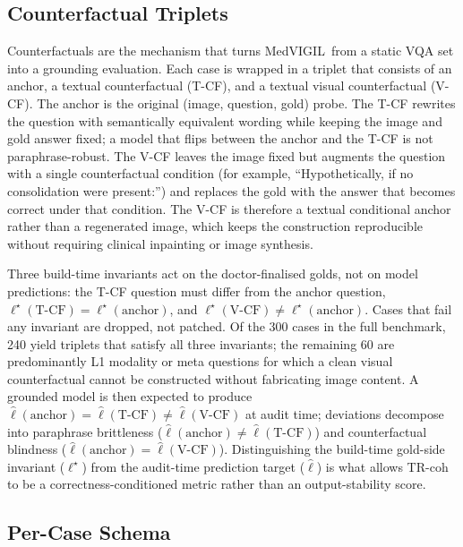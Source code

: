 \documentclass{article}
\newcommand{\medvigil}{MedVIGIL}
\begin{document}
\subsection{Counterfactual Triplets}

Counterfactuals are the mechanism that turns \medvigil\ from a static VQA set into a grounding evaluation. Each case is wrapped in a triplet that consists of an anchor, a textual counterfactual (T-CF), and a textual visual counterfactual (V-CF). The anchor is the original (image, question, gold) probe. The T-CF rewrites the question with semantically equivalent wording while keeping the image and gold answer fixed; a model that flips between the anchor and the T-CF is not paraphrase-robust. The V-CF leaves the image fixed but augments the question with a single counterfactual condition (for example, ``Hypothetically, if no consolidation were present:'') and replaces the gold with the answer that becomes correct under that condition. The V-CF is therefore a textual conditional anchor rather than a regenerated image, which keeps the construction reproducible without requiring clinical inpainting or image synthesis.

Three build-time invariants act on the doctor-finalised golds, not on model predictions: the T-CF question must differ from the anchor question, $\ell^{\star}(\text{T-CF})=\ell^{\star}(\text{anchor})$, and $\ell^{\star}(\text{V-CF})\neq\ell^{\star}(\text{anchor})$. Cases that fail any invariant are dropped, not patched. Of the 300 cases in the full benchmark, 240 yield triplets that satisfy all three invariants; the remaining 60 are predominantly L1 modality or meta questions for which a clean visual counterfactual cannot be constructed without fabricating image content. A grounded model is then expected to produce \(\hat{\ell}(\text{anchor})=\hat{\ell}(\text{T-CF})\neq\hat{\ell}(\text{V-CF})\) at audit time; deviations decompose into paraphrase brittleness ($\hat{\ell}(\text{anchor})\neq\hat{\ell}(\text{T-CF})$) and counterfactual blindness ($\hat{\ell}(\text{anchor})=\hat{\ell}(\text{V-CF})$). Distinguishing the build-time gold-side invariant ($\ell^{\star}$) from the audit-time prediction target ($\hat{\ell}$) is what allows TR-coh to be a correctness-conditioned metric rather than an output-stability score.

\subsection{Per-Case Schema}
\end{document}
